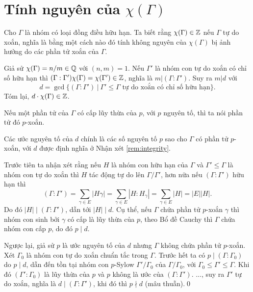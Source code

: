 \section{Tính nguyên của $\chi(\Gamma)$}

Cho $\Gamma$ là nhóm có loại đồng điều hữu hạn. Ta biết rằng $\chi(\Gamma) \in \mathbb Z$ nếu $\Gamma$ tự do xoắn, nghĩa là bằng một cách nào đó tính không nguyên của $\chi(\Gamma)$ bị ảnh hưởng do các phần tử xoắn của $\Gamma$.

\begin{remark}\label{rem:integrity}
    Giả sử $\chi(\Gamma) = n/m \in \mathbb Q$ với $(n,m) = 1$. Nếu $\Gamma'$ là nhóm con tự do xoắn có chỉ số hữu hạn thì $(\Gamma : \Gamma') \chi(\Gamma) = \chi(\Gamma') \in \mathbb Z$, nghĩa là $m | (\Gamma : \Gamma')$. Suy ra $m | d$ với
    $$
        d = \gcd\{ (\Gamma : \Gamma')\ |\ \Gamma' \leq \Gamma \text{ tự do xoắn có chỉ số hữu hạn}\}.
    $$
    Tóm lại, $d \cdot \chi(\Gamma) \in \mathbb Z$.
\end{remark}

\begin{define}
    Nếu một phần tử của $\Gamma$ có cấp lũy thừa của $p$, với $p$ nguyên tố, thì ta nói phần tử đó $p$-xoắn.
\end{define}

\begin{lemma}
    Các ước nguyên tố của $d$ chính là các số nguyên tố $p$ sao cho $\Gamma$ có phần tử $p$-xoắn, với $d$ được định nghĩa ở Nhận xét \ref{rem:integrity}.
\end{lemma}
\startproof Trước tiên ta nhận xét rằng nếu $H$ là nhóm con hữu hạn của $\Gamma$ và $\Gamma' \leq \Gamma$ là nhóm con tự do xoắn thì $H$ tác động tự do lên $\Gamma / \Gamma'$, hơn nữa nếu $(\Gamma:\Gamma')$ hữu hạn thì
$$
    (\Gamma:\Gamma') = \sum_{\gamma \in E} |H\gamma| = \sum_{\gamma \in E} |H:H_\gamma| = \sum_{\gamma \in E} |H| = |E| |H|.
$$
Do đó $|H| \mid (\Gamma : \Gamma')$, dẫn tới $|H| \mid d$. Cụ thể, nếu $\Gamma$ chứa phần tử $p$-xoắn $\gamma$ thì nhóm con sinh bởi $\gamma$ có cấp là lũy thừa của $p$, theo Bổ đề Cauchy thì $\Gamma$ chứa nhóm con cấp $p$, do đó $p \mid d$.

Ngược lại, giả sử $p$ là ước nguyên tố của $d$ nhưng $\Gamma$ không chứa phần tử $p$-xoắn. Xét $\Gamma_0$ là nhóm con tự do xoắn chuẩn tắc trong $\Gamma$. Trước hết ta có $p \mid (\Gamma : \Gamma_0)$ do $p \mid d$, dẫn đến tồn tại nhóm con $p$-Sylow $\Gamma' / \Gamma_0$ của $\Gamma / \Gamma_0$, với $\Gamma_0 \leq \Gamma' \leq \Gamma$. Khi đó $(\Gamma':\Gamma_0)$ là lũy thừa của $p$ và $p$ không là ước của $(\Gamma:\Gamma')$. ..., suy ra $\Gamma'$ tự do xoắn, nghĩa là $d \mid (\Gamma:\Gamma')$, khi đó thì $p \nmid d$ (mâu thuẫn).\qed

